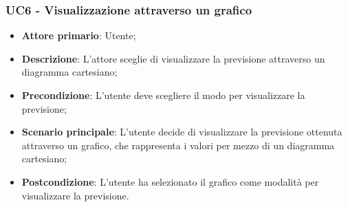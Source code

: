 \subsubsection{UC6 - Visualizzazione attraverso un grafico}
\label{sssec:uc6}
\begin{itemize}
  \item \textbf{Attore primario}: Utente;
  \item \textbf{Descrizione}: L'attore sceglie di visualizzare la previsione attraverso un diagramma cartesiano;
  \item \textbf{Precondizione}: L'utente deve scegliere il modo per visualizzare la previsione;
  \item \textbf{Scenario principale}: L'utente decide di visualizzare la previsione ottenuta attraverso un grafico, che rappresenta i valori per mezzo di un diagramma cartesiano;
  \item \textbf{Postcondizione}: L'utente ha selezionato il grafico come modalità per visualizzare la previsione.
\end{itemize}
